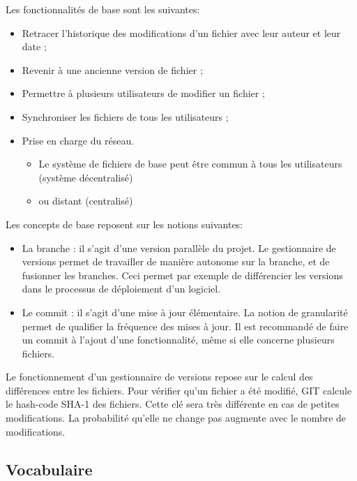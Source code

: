 Les fonctionnalités de base sont les suivantes:
\begin{itemize}
\item Retracer l'historique des modifications d'un fichier avec leur auteur et leur date ;
\item Revenir à une ancienne version de fichier ;
\item Permettre à plusieurs utilisateurs de modifier un fichier ;
\item Synchroniser les fichiers de tous les utilisateurs ;
\item Prise en charge du réseau. 
\begin{itemize}
\item Le système de fichiers de base peut être commun à tous les utilisateurs (système décentralisé)
\item ou distant (centralisé)
\end{itemize}
\end{itemize}

Les concepts de base reposent sur les notions suivantes:
\begin{itemize}
\item La branche : il s'agit d'une version parallèle du projet. Le gestionnaire de versions permet de travailler de manière autonome sur la branche, et de fusionner les branches. Ceci permet par exemple de différencier les versions dans le processus de déploiement d'un logiciel. 
\item Le commit : il s'agit d'une mise à jour élémentaire. La notion de granularité permet de qualifier la fréquence des mises à jour. Il est recommandé de faire un commit à l'ajout d'une fonctionnalité, même si elle concerne plusieurs fichiers. 
\end{itemize}

Le fonctionnement d'un gestionnaire de versions repose sur le calcul des différences entre les fichiers. Pour vérifier qu'un fichier a été modifié, GIT calcule le hash-code SHA-1 des fichiers. Cette clé sera très différente en cas de petites modifications. La probabilité qu'elle ne change pas augmente avec le nombre de modifications. 



\subsection{Vocabulaire}

